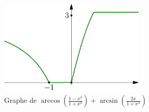 \begin{figure}[h!t]
 \centering
 \includegraphics[width=7cm]{Celem9_1.pdf}
 \caption{Graphe de $\arccos \left(\frac{1-x^2}{1+x^2}\right) + \arcsin \left( \frac{2x}{1+x^2}\right)$}
 \label{fig:Celem9_1}
\end{figure}
